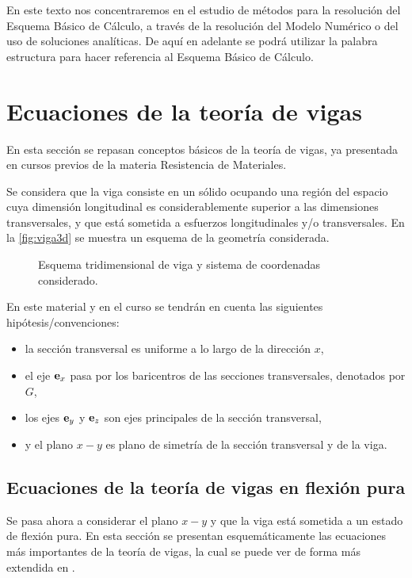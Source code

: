 En este texto nos concentraremos en el estudio de métodos para la resolución del Esquema Básico de Cálculo, a través de la resolución del Modelo Numérico o del uso de soluciones analíticas. %
%
De aquí en adelante se podrá utilizar la palabra estructura para hacer referencia al Esquema Básico de Cálculo.






\section{Ecuaciones de la teoría de vigas} \label{sec:teovigastimo}

En esta sección se repasan conceptos básicos de la teoría de vigas, ya presentada en cursos previos de la materia Resistencia de Materiales. %

Se considera que la viga consiste en un sólido ocupando una región del espacio cuya dimensión longitudinal es considerablemente superior a las dimensiones transversales, y que está sometida a esfuerzos longitudinales y/o transversales. %
%
En la \autoref{fig:viga3d} se muestra un esquema de la geometría considerada. %
%
\begin{figure}[htb]
	\centering
	\def\svgwidth{0.5\textwidth}
	
	\caption{Esquema tridimensional de viga y sistema de coordenadas considerado.}
	\label{fig:viga3d}
\end{figure}

%
En este material y en el curso se tendrán en cuenta las siguientes hipótesis/convenciones:
%
\begin{itemize}
	\item la sección transversal es uniforme a lo largo de la dirección $x$, %
	\item el eje ${\bf e}_x$ pasa por los baricentros de las secciones transversales, denotados por $G$,
	\item los ejes ${\bf e}_y$ y ${\bf e}_z$ son ejes principales de la sección transversal,
	\item y el plano $x-y$ es plano de simetría de la sección transversal y de la viga.
\end{itemize}


\subsection{Ecuaciones de la teoría de vigas en flexión pura}

Se pasa ahora a considerar el plano $x-y$ y que la viga está sometida a un estado de flexión pura. %
%
En esta sección se presentan esquemáticamente las ecuaciones más importantes de la teoría de vigas, la cual se puede ver de forma más extendida en \citep{Timoshenko1940a}. %

